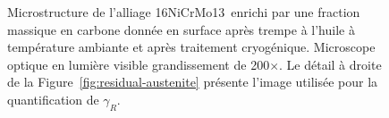 \begin{figure}[!h]
{{}
  }
  
  \caption{\label{fig:cryogenic_effect_aero}Microstructure de l'alliage 16NiCrMo13 enrichi par une fraction massique en carbone donnée en surface après trempe à l'huile à température ambiante et après traitement cryogénique. Microscope optique en lumière visible \textendash{} grandissement de 200$\times$. Le détail à droite de la Figure~\ref{fig:residual-austenite} présente l'image utilisée pour la quantification de $\gamma_{R}$.}
\end{figure}

